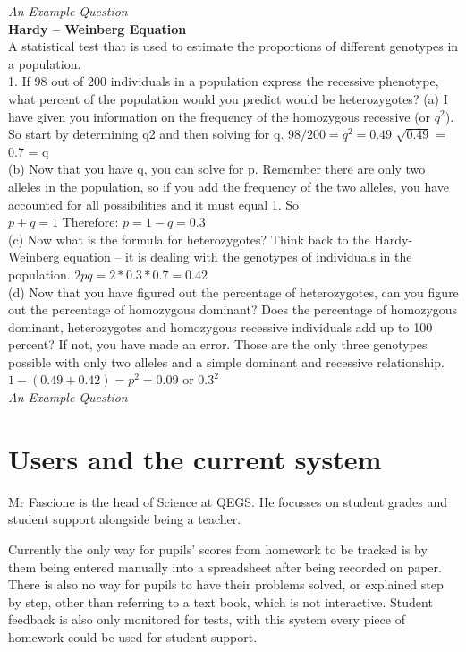 \documentclass[a4paper,12pt]{report}
\begin{document}
\begin{flushleft}
	\emph{An Example Question}\\
	\bigskip
\textbf{Hardy – Weinberg Equation}\\
A statistical test that is used to estimate the proportions of different genotypes in a population.\\
1. If 98 out of 200 individuals in a population express the recessive phenotype, what percent of the population would you predict would be heterozygotes?
(a) I have given you information on the frequency of the homozygous recessive (or $q^2$). So start by determining q2 and then solving for q.  $ 98/200 =  q^2 = 0.49 $
$\sqrt{0.49}$ = 0.7 = q\\
(b) Now that you have q, you can solve for p. Remember there are only two alleles in the population, so if you add the frequency of the two alleles, you have accounted for all possibilities and it must equal 1. So $ p + q = 1 \text{ Therefore: } p = 1-q = 0.3$\\
(c) Now what is the formula for heterozygotes? Think back to the Hardy-Weinberg equation -- it is dealing with the genotypes of individuals in the population.
$ 2pq = 2*0.3*0.7 = 0.42 $\\
(d) Now that you have figured out the percentage of heterozygotes, can you figure out the percentage of homozygous dominant? Does the percentage of homozygous dominant, heterozygotes and homozygous recessive individuals add up to 100 percent? If not, you have made an error. Those are the only three genotypes possible with only two alleles and a simple dominant and recessive relationship.
$ 1-(0.49 + 0.42) = p^2 = 0.09 \text{ or } 0.3^2 $\\
\emph{An Example Question}
\end{flushleft}


\section{Users and the current system}

Mr Fascione is the head of Science at QEGS.  He focusses on student grades and student support alongside being a teacher.\bigskip

Currently the only way for pupils’ scores from homework to be tracked is by them being entered manually into a spreadsheet after being recorded on paper. There is also no way for pupils to have their problems solved, or explained step by step, other than referring to a text book, which is not interactive. Student feedback is also only monitored for tests, with this system every piece of homework could be used for student support.\bigskip
\end{document}
